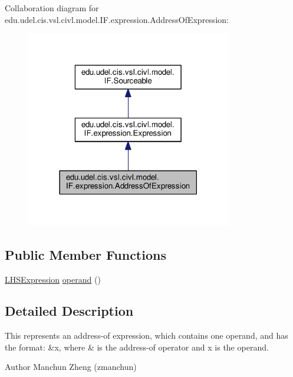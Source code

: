 Collaboration diagram for edu.\+udel.\+cis.\+vsl.\+civl.\+model.\+I\+F.\+expression.\+Address\+Of\+Expression\+:
\nopagebreak
\begin{figure}[H]
\begin{center}
\leavevmode
\includegraphics[width=254pt]{interfaceedu_1_1udel_1_1cis_1_1vsl_1_1civl_1_1model_1_1IF_1_1expression_1_1AddressOfExpression__coll__graph}
\end{center}
\end{figure}
\subsection*{Public Member Functions}
\begin{DoxyCompactItemize}
\item 
\hyperlink{interfaceedu_1_1udel_1_1cis_1_1vsl_1_1civl_1_1model_1_1IF_1_1expression_1_1LHSExpression}{L\+H\+S\+Expression} \hyperlink{interfaceedu_1_1udel_1_1cis_1_1vsl_1_1civl_1_1model_1_1IF_1_1expression_1_1AddressOfExpression_a398424338dedc21cba38e718427582e2}{operand} ()
\end{DoxyCompactItemize}


\subsection{Detailed Description}
This represents an address-\/of expression, which contains one operand, and has the format\+: {\ttfamily \&x}, where {\ttfamily \&} is the address-\/of operator and {\ttfamily x} is the operand. 

\begin{DoxyAuthor}{Author}
Manchun Zheng (zmanchun) 
\end{DoxyAuthor}


